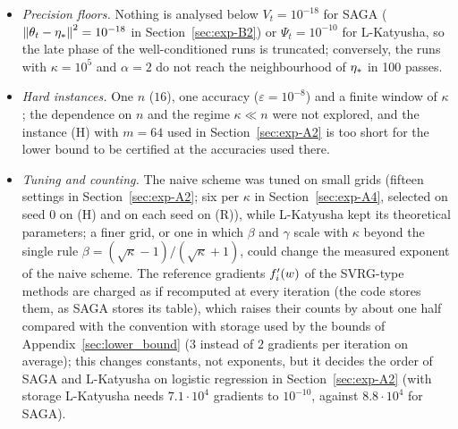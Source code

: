 \begin{itemize}[leftmargin=1.4em,itemsep=1pt,topsep=2pt]
a-posteriori, not guarantees.
\item \emph{Precision floors.} Nothing is analysed below $V_t=10^{-18}$ for SAGA ($\left\|\theta_t-\eta_\ast\right\|^2=10^{-18}$
in Section~\ref{sec:exp-B2}) or $\Psi_t=10^{-10}$ for L-Katyusha, so the late phase of the well-conditioned runs is
truncated; conversely, the runs with $\kappa=10^5$ and $\alpha=2$ do not reach the neighbourhood of $\eta_\ast$ in 100
passes.
\item \emph{Hard instances.} One $n$ ($16$), one accuracy ($\varepsilon=10^{-8}$) and a finite window of $\kappa$; the
dependence on $n$ and the regime $\kappa\ll n$ were not explored, and the instance (H) with $m=64$ used in
Section~\ref{sec:exp-A2} is too short for the lower bound to be certified at the accuracies used there.
\item \emph{Tuning and counting.} The naive scheme was tuned on small grids (fifteen settings in
Section~\ref{sec:exp-A2}; six per $\kappa$ in Section~\ref{sec:exp-A4}, selected on seed $0$ on (H) and on each seed on
(R)), while L-Katyusha kept its theoretical parameters; a finer grid, or one in which $\beta$ and $\gamma$ scale with
$\kappa$ beyond the single rule $\beta=(\sqrt\kappa-1)/(\sqrt\kappa+1)$, could change the measured exponent of the
naive scheme. The reference gradients $f'_i(w)$ of the SVRG-type methods are charged as if recomputed at every
iteration (the code stores them, as SAGA stores its table), which raises their counts by about one half compared with
the convention with storage used by the bounds of Appendix~\ref{sec:lower_bound} ($3$ instead of $2$ gradients per
iteration on average); this changes constants, not exponents, but it decides the order of SAGA and L-Katyusha on
logistic regression in Section~\ref{sec:exp-A2} (with storage L-Katyusha needs $7.1\cdot10^4$ gradients to
$10^{-10}$, against $8.8\cdot10^4$ for SAGA).
\end{itemize}

